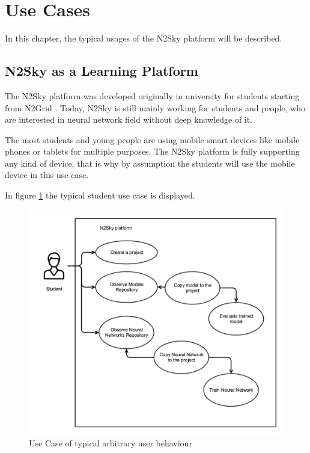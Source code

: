 \section{Use Cases}\label{Use Cases}

In this chapter, the typical usages of the N2Sky platform will be described.

\subsection{N2Sky as a Learning Platform}\label{N2Sky as a learning platform}

The N2Sky platform was developed originally in university for students starting from N2Grid \cite{schikuta2004n2grid}. Today, N2Sky is still mainly working for students and people, who are interested in neural network field without deep knowledge of it. 

The most students and young people are using mobile smart devices like mobile phones or tablets for multiple purposes. The N2Sky platform is fully supporting any kind of device, that is why by assumption the students will use the mobile device in this use case. 

In figure \ref{fig:use_case_student} the typical student use case is displayed.


\begin{figure}[htbp]
\begin{center}
  \includegraphics[width=\linewidth]{components/usecase/img/use_case_student.png}
  \caption{Use Case of typical arbitrary user behaviour}
  \label{fig:use_case_student}
\end{center}
\end{figure} 

